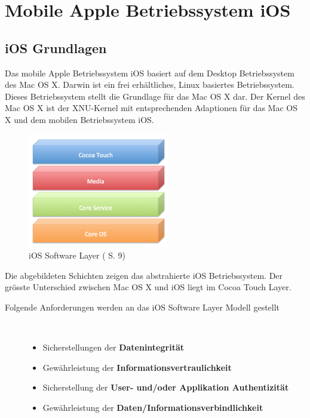 %
%
% 
% 
% 
\chapter{Mobile Apple Betriebssystem iOS}
\label{ch:iOS}
\section{iOS Grundlagen}
\label{sec:iOSGrundlage}

Das mobile Apple Betriebssystem iOS basiert auf dem Desktop Betriebssystem des Mac OS X. Darwin ist ein frei erhältliches, Linux basiertes Betriebssystem. Dieses Betriebssystem stellt die Grundlage für das Mac OS X dar. Der Kernel des Mac OS X ist der XNU-Kernel mit entsprechenden Adaptionen für das Mac OS X und dem mobilen Betriebssystem iOS.\par 
\begin{figure}[hp!]
        \centering
                \includegraphics[height=5cm]{Bilder/Chapter3_SystemArchitektur}
        \caption{iOS Software Layer (\cite{Apple[5]} S. 9)}
        	\label{fig:iOS Software Layer}
\end{figure}
Die abgebildeten Schichten zeigen das abstrahierte iOS Betriebssystem. Der grösste Unterschied zwischen Mac OS X und iOS liegt im Cocoa Touch Layer.
  
\begin{description}
\item[Folgende Anforderungen werden an das iOS Software Layer Modell gestellt]~\par
	\begin{itemize}
		\item Sicherstellungen der \textbf{Datenintegrität}
		\item Gewährleistung der \textbf{Informationsvertraulichkeit}
		\item Sicherstellung der \textbf{User- und/oder Applikation Authentizität}
		\item Gewährleistung der \textbf{Daten/Informationsverbindlichkeit}
	\end{itemize}
\end{description}

